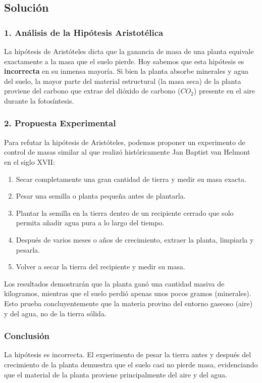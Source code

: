 \documentclass[12pt, a4paper]{article}
\begin{document}
\subsection*{Solución}

\subsubsection*{1. Análisis de la Hipótesis Aristotélica}
La hipótesis de Aristóteles dicta que la ganancia de masa de una planta equivale exactamente a la masa que el suelo pierde. Hoy sabemos que esta hipótesis es \textbf{incorrecta} en su inmensa mayoría. Si bien la planta absorbe minerales y agua del suelo, la mayor parte del material estructural (la masa seca) de la planta proviene del carbono que extrae del dióxido de carbono ($CO_2$) presente en el aire durante la fotosíntesis.

\subsubsection*{2. Propuesta Experimental}
Para refutar la hipótesis de Aristóteles, podemos proponer un experimento de control de masas similar al que realizó históricamente Jan Baptist van Helmont en el siglo XVII:
\begin{enumerate}
    \item Secar completamente una gran cantidad de tierra y medir su masa exacta.
    \item Pesar una semilla o planta pequeña antes de plantarla.
    \item Plantar la semilla en la tierra dentro de un recipiente cerrado que solo permita añadir agua pura a lo largo del tiempo.
    \item Después de varios meses o años de crecimiento, extraer la planta, limpiarla y pesarla.
    \item Volver a secar la tierra del recipiente y medir su masa.
\end{enumerate}

Los resultados demostrarán que la planta ganó una cantidad masiva de kilogramos, mientras que el suelo perdió apenas unos pocos gramos (minerales). Esto prueba concluyentemente que la materia provino del entorno gaseoso (aire) y del agua, no de la tierra sólida.

\subsubsection*{Conclusión}
La hipótesis es incorrecta. El experimento de pesar la tierra antes y después del crecimiento de la planta demuestra que el suelo casi no pierde masa, evidenciando que el material de la planta proviene principalmente del aire y del agua.
\end{document}

